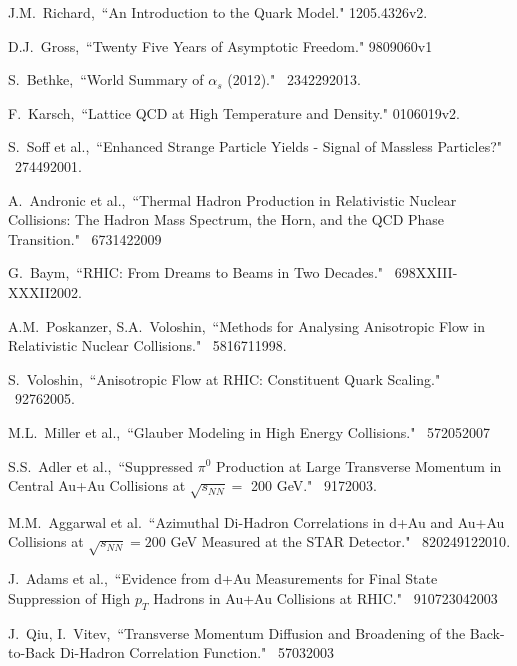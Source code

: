 \begin{thebibliography}{1000}


J.M.~Richard,~``An Introduction to the Quark Model." \arXiv1205.4326v2.

D.J.~Gross,~``Twenty Five Years of Asymptotic Freedom." \arXiv9809060v1

S.~Bethke,~``World Summary of $\alpha_{s}$ (2012)." \Journal{\NPB} {~234}{229}{2013}.

F.~Karsch,~``Lattice QCD at High Temperature and Density." \arXiv0106019v2.

S.~Soff et al.,~``Enhanced Strange Particle Yields - Signal of Massless Particles?" \Journal{\JPG} {~27}{449}{2001}.

A.~Andronic et al.,~``Thermal Hadron Production in Relativistic Nuclear Collisions: The Hadron Mass Spectrum, the Horn, and the QCD Phase Transition." \Journal{\PLB} {~673}{142}{2009}

G.~Baym,~``RHIC: From Dreams to Beams in Two Decades." \Journal{\NPA} {~698}{XXIII-XXXII}{2002}.

A.M.~Poskanzer, S.A.~Voloshin,~``Methods for Analysing Anisotropic Flow in Relativistic Nuclear Collisions." \Journal{\PRC} {~58}{1671}{1998}.

S.~Voloshin,~``Anisotropic Flow at RHIC: Constituent Quark Scaling." \textit {}~{} {~9}{276}{2005}.

M.L.~Miller et al.,~``Glauber Modeling in High Energy Collisions." \Journal{\ARNPS} {~57}{205}{2007}

S.S.~Adler et al.,~``Suppressed $\pi^0$ Production at Large Transverse Momentum in Central Au+Au Collisions at $\sqrt{s_{NN}} = $ 200 GeV." \Journal{\PRL} {~91}{7}{2003}.

M.M.~Aggarwal et al.~``Azimuthal Di-Hadron Correlations in d+Au and Au+Au Collisions at $\sqrt{s_{NN}} = 200$ GeV Measured at the STAR Detector." \Journal{\PRC} {~82}{024912}{2010}.

J.~Adams et al.,~``Evidence from d+Au Measurements for Final State Suppression of High $p_T$ Hadrons in Au+Au Collisions at RHIC." \Journal{\PRL} {~91}{072304}{2003}

J.~Qiu, I.~Vitev,~``Transverse Momentum Diffusion and Broadening of the Back-to-Back Di-Hadron Correlation Function." \Journal{\PLB} {~570}{3}{2003}


\end{thebibliography}
